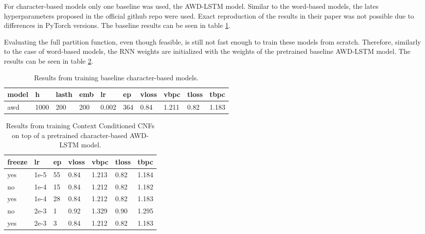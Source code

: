 For character-based models only one baseline was used, the AWD-LSTM \citep{merity2017regularizing} model. Similar to the word-based models, the lates hyperparameters proposed in the official github repo were used. Exact reproduction of the results in their paper was not possible due to differences in PyTorch versions. The baseline results can be seen in table \ref{table:experiments:baselines_char}.

Evaluating the full partition function, even though feasible, is still not fast enough to train these models from scratch. Therefore, similarly to the case of word-based models, the RNN weights are initialized with the weights of the pretrained baseline AWD-LSTM model. The results can be seen in table \ref{table:experiments:cnfh_characters}.

\begin{table}[]
\centering
\caption{Results from training baseline character-based models.}
\begin{tabular}{|l|l|l|l|l|l|l|l|l|l|}
\hline
\textbf{model} & \textbf{h} & \textbf{lasth} & \textbf{emb} & \textbf{lr} & \textbf{ep} & \textbf{vloss} & \textbf{vbpc} & \textbf{tloss} & \textbf{tbpc} \\ \hline
awd       & 1000       & 200            & 200          & 0.002       & 364         & 0.84           & 1.211         & 0.82           & 1.183         \\ \hline
\end{tabular}
\label{table:experiments:baselines_char}
\end{table}

\begin{table}[]
\centering
\caption{Results from training Context Conditioned CNFs on top of a pretrained character-based AWD-LSTM model.}
\begin{tabular}{|l|l|l|l|l|l|l|}
\hline
\textbf{freeze} & \textbf{lr} & \textbf{ep} & \textbf{vloss} & \textbf{vbpc} & \textbf{tloss} & \textbf{tbpc} \\ \hline
yes             & 1e-5        & 55          & 0.84           & 1.213         & 0.82           & 1.184         \\ \hline
no              & 1e-4        & 15          & 0.84           & 1.212         & 0.82           & 1.182         \\ \hline
yes             & 1e-4        & 28          & 0.84           & 1.212         & 0.82           & 1.183         \\ \hline
no              & 2e-3        & 1           & 0.92           & 1.329         & 0.90           & 1.295         \\ \hline
yes             & 2e-3        & 3           & 0.84           & 1.212         & 0.82           & 1.183         \\ \hline
\end{tabular}
\label{table:experiments:cnfh_characters}
\end{table}